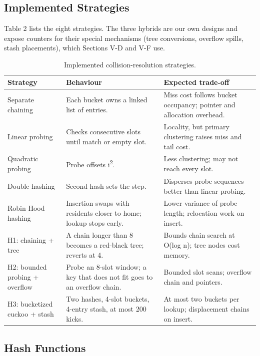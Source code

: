 \documentclass{ieeeaccess}
\begin{document}
\subsection{Implemented Strategies}

Table 2 lists the eight strategies. The three hybrids are our own designs and expose counters for their special mechanisms (tree conversions, overflow spills, stash placements), which Sections V-D and V-F use.

\begin{table}[!t]
\caption{Implemented collision-resolution strategies.}
\label{tab:2}
\centering
\scriptsize
\setlength{\tabcolsep}{3pt}
\begin{tabular}{|>{\raggedright\arraybackslash}p{}|>{\raggedright\arraybackslash}p{}|>{\raggedright\arraybackslash}p{}|}
\hline
\textbf{Strategy} & \textbf{Behaviour} & \textbf{Expected trade-off} \\
\hline
Separate chaining & Each bucket owns a linked list of entries. & Miss cost follows bucket occupancy; pointer and allocation overhead. \\
Linear probing & Checks consecutive slots until match or empty slot. & Locality, but primary clustering raises miss and tail cost. \\
Quadratic probing & Probe offsets i\textsuperscript{2}. & Less clustering; may not reach every slot. \\
Double hashing & Second hash sets the step. & Disperses probe sequences better than linear probing. \\
Robin Hood hashing & Insertion swaps with residents closer to home; lookup stops early. & Lower variance of probe length; relocation work on insert. \\
H1: chaining + tree & A chain longer than 8 becomes a red-black tree; reverts at 4. & Bounds chain search at O(log n); tree nodes cost memory. \\
H2: bounded probing + overflow & Probe an 8-slot window; a key that does not fit goes to an overflow chain. & Bounded slot scans; overflow chain and pointers. \\
H3: bucketized cuckoo + stash & Two hashes, 4-slot buckets, 4-entry stash, at most 200 kicks. & At most two buckets per lookup; displacement chains on insert. \\
\hline
\end{tabular}
\end{table}


\subsection{Hash Functions}
\end{document}
